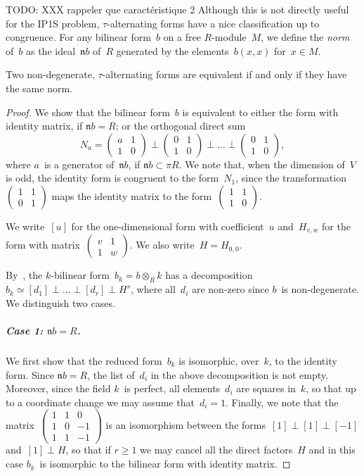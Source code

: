 \documentclass{lms}
\def\todo#1{{\color{orange}TODO: #1}}
\let\fr\mathfrak
\def\mat#1{\begin{pmatrix}#1\end{pmatrix}}
\begin{document}
\todo{XXX rappeler que caractéristique 2}
Although this is not directly useful for the IP1S problem,
$τ$-alternating forms have a nice classification up to congruence.
For any bilinear form~$b$ on a free $R$-module~$M$, we define the
\emph{norm} of~$b$ as the ideal~$\fr{n} b$ of~$R$
generated by the elements~$b(x, x)$ for~$x ∈ M$.

\begin{prop}\label{prop:eqv-norm}
Two non-degenerate, $τ$-alternating forms are equivalent if and only
if they have the same norm.
\end{prop}
\begin{proof}
We show that the bilinear form~$b$ is equivalent to either the form with
identity matrix, if $\fr n b = R$; or the orthogonal direct sum
\[ N_a = \mat{a & 1\\1&0} ⟂ \mat{0 & 1\\1&0} ⟂ … ⟂ \mat {0 & 1\\ 1 & 0}, \]
where $a$~is a generator of~$\fr n b$, if $\fr n b ⊂ π R$.
We note that, when the dimension of~$V$ is odd, the identity form is
congruent to the form~$N_1$, since the transformation~$\mat{1&1\\0&1}$
maps the identity matrix to the form~$\mat{1&1\\1&0}$.

We write~$[u]$ for the one-dimensional form with coefficient~$u$
and~$H_{v, w}$ for the form with matrix~$\mat{v&1\\1&w}$.
We also write~$H = H_{0,0}$.

By~\cite[§2]{milnor2}, the $k$-bilinear form~$b_k = b ⊗_R k$ has a
decomposition~$b_k ≃ [d_1] ⟂ … ⟂ [d_r] ⟂ H^s$, where all~$d_i$ are
non-zero since $b$~is non-degenerate. We distinguish two cases.

\subparagraph{Case 1: $\fr n b = R$.}
We first show that the reduced form~$b_k$ is isomorphic, over~$k$, to the
identity form. Since $\fr n b = R$, the list of~$d_i$ in the above
decomposition is not empty. Moreover, since the field $k$~is perfect, all
elements~$d_i$ are squares in~$k$, so that up to a coordinate change we
may assume that~$d_i = 1$. Finally, we note that the
matrix~$\mat{1&1&0\\1&0&-1\\1&1&-1}$ is an isomorphism between the
forms~$[1] ⟂ [1] ⟂ [-1]$ and~$[1] ⟂ H$, so that if $r ≥ 1$ we may cancel
all the direct factors~$H$ and in this case $b_k$~is isomorphic to the
bilinear form with identity matrix.


\end{proof}
\end{document}
